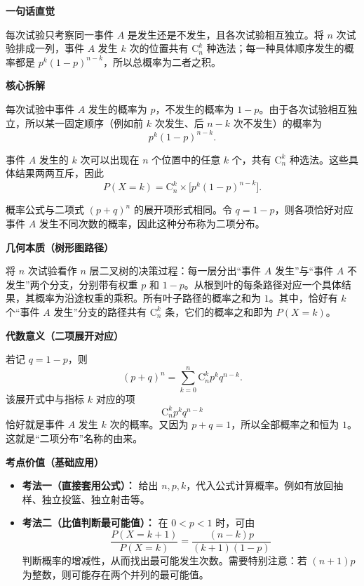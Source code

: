 \begin{explanationbox}
	\textbf{\textcolor{CExplanation}{一句话直觉}}

	每次试验只考察同一事件 $A$ 是发生还是不发生，且各次试验相互独立。将 $n$ 次试验排成一列，事件 $A$ 发生 $k$ 次的位置共有 $\mathrm{C}_n^k$ 种选法；每一种具体顺序发生的概率都是 $p^k(1-p)^{n-k}$，所以总概率为二者之积。

	\medskip
	\textbf{\textcolor{CExplanation}{核心拆解}}
	\begin{description}[style=nextline, leftmargin=2.8em, labelsep=0.5em, itemsep=0.45em]
		\item[\textbf{要点一（独立性保证相乘）：}] 每次试验中事件 $A$ 发生的概率为 $p$，不发生的概率为 $1-p$。由于各次试验相互独立，所以某一固定顺序（例如前 $k$ 次发生、后 $n-k$ 次不发生）的概率为
		      \[
			      p^k(1-p)^{n-k}.
		      \]

		\item[\textbf{要点二（组合数计数位置）：}] 事件 $A$ 发生的 $k$ 次可以出现在 $n$ 个位置中的任意 $k$ 个，共有 $\mathrm{C}_n^k$ 种选法。这些具体结果两两互斥，因此
		      \[
			      P(X=k)=\mathrm{C}_n^k \times \bigl[p^k(1-p)^{n-k}\bigr].
		      \]

		\item[\textbf{要点三（二项展开联系）：}] 概率公式与二项式 $(p+q)^n$ 的展开项形式相同。令 $q=1-p$，则各项恰好对应事件 $A$ 发生不同次数的概率，因此这种分布称为二项分布。
	\end{description}

	\medskip
	\textbf{\textcolor{CExplanation}{几何本质（树形图路径）}}

	将 $n$ 次试验看作 $n$ 层二叉树的决策过程：每一层分出“事件 $A$ 发生”与“事件 $A$ 不发生”两个分支，分别带有权重 $p$ 和 $1-p$。从根到叶的每条路径对应一个具体结果，其概率为沿途权重的乘积。所有叶子路径的概率之和为 $1$。其中，恰好有 $k$ 个“事件 $A$ 发生”分支的路径共有 $\mathrm{C}_n^k$ 条，它们的概率之和即为 $P(X=k)$。

	\medskip
	\textbf{\textcolor{CExplanation}{代数意义（二项展开对应）}}

	若记 $q=1-p$，则
	\[
		(p+q)^n=\sum_{k=0}^n \mathrm{C}_n^k p^k q^{n-k}.
	\]
	该展开式中与指标 $k$ 对应的项
	\[
		\mathrm{C}_n^k p^k q^{n-k}
	\]
	恰好就是事件 $A$ 发生 $k$ 次的概率。又因为 $p+q=1$，所以全部概率之和恒为 $1$。这就是“二项分布”名称的由来。

	\medskip
	\textbf{\textcolor{CExplanation}{考点价值（基础应用）}}
	\begin{itemize}[leftmargin=*, itemsep=0.5em, topsep=0.4em]
		\item \textbf{考法一（直接套用公式）：} 给出 $n,p,k$，代入公式计算概率。例如有放回抽样、独立投篮、独立射击等。
		\item \textbf{考法二（比值判断最可能值）：} 在 $0<p<1$ 时，可由
		      \[
			      \frac{P(X=k+1)}{P(X=k)}
			      =
			      \frac{(n-k)p}{(k+1)(1-p)}
		      \]
		      判断概率的增减性，从而找出最可能发生次数。需要特别注意：若 $(n+1)p$ 为整数，则可能存在两个并列的最可能值。
	\end{itemize}


\end{explanationbox}
